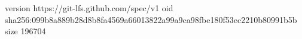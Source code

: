 version https://git-lfs.github.com/spec/v1
oid sha256:099b8a889b28d8b8fa4569a66013822a99a9ca98fbe180f53ec2210b80991b5b
size 196704
